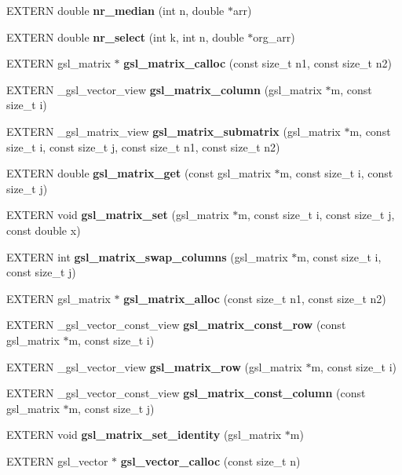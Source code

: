 \begin{CompactItemize}
\item 
EXTERN double {\bf nr\_\-median} (int n, double $\ast$arr)
\item 
EXTERN double {\bf nr\_\-select} (int k, int n, double $\ast$org\_\-arr)
\item 
EXTERN gsl\_\-matrix $\ast$ \textbf{gsl\_\-matrix\_\-calloc} (const size\_\-t n1, const size\_\-t n2)\label{group__nr_gf2e18583a2759c9d0f78b564f40eccd7}

\item 
EXTERN \_\-gsl\_\-vector\_\-view {\bf gsl\_\-matrix\_\-column} (gsl\_\-matrix $\ast$m, const size\_\-t i)
\item 
EXTERN \_\-gsl\_\-matrix\_\-view {\bf gsl\_\-matrix\_\-submatrix} (gsl\_\-matrix $\ast$m, const size\_\-t i, const size\_\-t j, const size\_\-t n1, const size\_\-t n2)
\item 
EXTERN double {\bf gsl\_\-matrix\_\-get} (const gsl\_\-matrix $\ast$m, const size\_\-t i, const size\_\-t j)
\item 
EXTERN void {\bf gsl\_\-matrix\_\-set} (gsl\_\-matrix $\ast$m, const size\_\-t i, const size\_\-t j, const double x)
\item 
EXTERN int {\bf gsl\_\-matrix\_\-swap\_\-columns} (gsl\_\-matrix $\ast$m, const size\_\-t i, const size\_\-t j)
\item 
EXTERN gsl\_\-matrix $\ast$ \textbf{gsl\_\-matrix\_\-alloc} (const size\_\-t n1, const size\_\-t n2)\label{group__nr_g3c416b23f730c2e06cb5e9b257f1f571}

\item 
EXTERN \_\-gsl\_\-vector\_\-const\_\-view \textbf{gsl\_\-matrix\_\-const\_\-row} (const gsl\_\-matrix $\ast$m, const size\_\-t i)\label{group__nr_g1b0f557b9e570f397ab13dcc24e09e35}

\item 
EXTERN \_\-gsl\_\-vector\_\-view \textbf{gsl\_\-matrix\_\-row} (gsl\_\-matrix $\ast$m, const size\_\-t i)\label{group__nr_gebf16339184d6759f4cdfa9c1724fb98}

\item 
EXTERN \_\-gsl\_\-vector\_\-const\_\-view \textbf{gsl\_\-matrix\_\-const\_\-column} (const gsl\_\-matrix $\ast$m, const size\_\-t j)\label{group__nr_gf288953bef254a8e2221d778c28f7f97}

\item 
EXTERN void \textbf{gsl\_\-matrix\_\-set\_\-identity} (gsl\_\-matrix $\ast$m)\label{group__nr_ge37f3f441742e70b1a701d92446e33fc}

\item 
EXTERN gsl\_\-vector $\ast$ \textbf{gsl\_\-vector\_\-calloc} (const size\_\-t n)\label{group__nr_gac4c2937f0e28c7a00cfe90b4ad886a6}


\end{CompactItemize}
